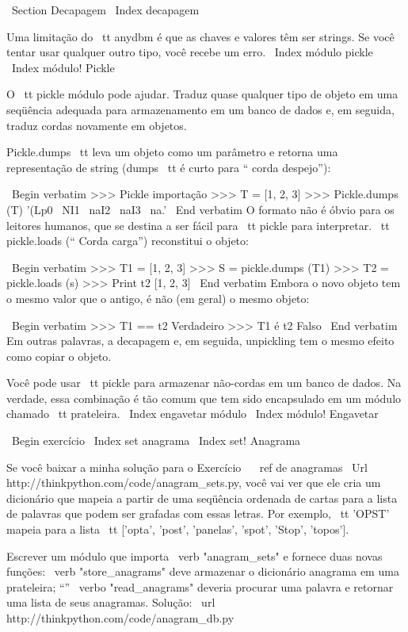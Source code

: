 \documentclass[10pt]{book}
\begin{document}
{{{{{{{{{{\ Section {} Decapagem
\ Index {} decapagem

Uma limitação do {\ tt anydbm} é que as chaves e valores têm
ser strings. Se você tentar usar qualquer outro tipo, você recebe um
erro.
\ Index {módulo pickle}
\ Index {módulo! Pickle}

O {\ tt pickle} módulo pode ajudar. Traduz
quase qualquer tipo de objeto em uma seqüência adequada para armazenamento em um
banco de dados e, em seguida, traduz cordas novamente em objetos.

{Pickle.dumps \ tt} leva um objeto como um parâmetro e retorna
uma representação de string ({dumps \ tt} é curto para `` corda despejo''):

\ Begin {verbatim}
>>> Pickle importação
>>> T = [1, 2, 3]
>>> Pickle.dumps (T)
'(Lp0 \ NI1 \ naI2 \ naI3 \ na.'
\ End {verbatim}
%
O formato não é óbvio para os leitores humanos, que se destina a ser
fácil para {\ tt pickle} para interpretar. {\ tt pickle.loads}
(`` Corda carga'') reconstitui o objeto:

\ Begin {verbatim}
>>> T1 = [1, 2, 3]
>>> S = pickle.dumps (T1)
>>> T2 = pickle.loads (s)
>>> Print t2
[1, 2, 3]
\ End {verbatim}
%
Embora o novo objeto tem o mesmo valor que o antigo, é
não (em geral) o mesmo objeto:

\ Begin {verbatim}
>>> T1 == t2
Verdadeiro
>>> T1 é t2
Falso
\ End {verbatim}
%
Em outras palavras, a decapagem e, em seguida, unpickling tem o mesmo efeito
como copiar o objeto.

Você pode usar {\ tt pickle} para armazenar não-cordas em um banco de dados.
Na verdade, essa combinação é tão comum que tem sido
encapsulado em um módulo chamado {\ tt prateleira}.  
\ Index {engavetar módulo}
\ Index {módulo! Engavetar}


\ Begin {} exercício
\ Index {set anagrama}
\ Index {set! Anagrama}

Se você baixar a minha solução para o Exercício ~ \ ref {} de anagramas
\ Url {http://thinkpython.com/code/anagram_sets.py}, você vai ver que ele cria
um dicionário que mapeia a partir de uma seqüência ordenada de cartas para a lista de
palavras que podem ser grafadas com essas letras. Por exemplo, {\ tt
  'OPST'} mapeia para a lista {\ tt ['opta', 'post', 'panelas', 'spot',
    'Stop', 'topos']}.

Escrever um módulo que importa \ verb "anagram_sets" e fornece
duas novas funções: \ verb "store_anagrams" deve armazenar o
dicionário anagrama em uma prateleira; ``'' \ verbo "read_anagrams" deveria
procurar uma palavra e retornar uma lista de seus anagramas.
Solução: \ url {http://thinkpython.com/code/anagram_db.py}

}}}}}}}}}}
\end{document}
